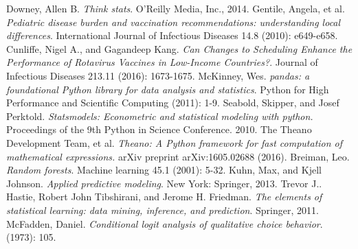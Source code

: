 \documentclass[prl,onecolumn,amsmath,amssymb,superscriptaddress,notitlepage]{revtex4-1}
\begin{document}
\begin{thebibliography}{1}
 Downey, Allen B. \emph{Think stats}. O'Reilly Media, Inc., 2014.
Gentile, Angela, et al. \emph{Pediatric disease burden and vaccination recommendations: understanding local differences}. International Journal of Infectious Diseases 14.8 (2010): e649-e658.
Cunliffe, Nigel A., and Gagandeep Kang. \emph{Can Changes to Scheduling Enhance the Performance of Rotavirus Vaccines in Low-Income Countries?}. Journal of Infectious Diseases 213.11 (2016): 1673-1675.
McKinney, Wes. \emph{pandas: a foundational Python library for data analysis and statistics}. Python for High Performance and Scientific Computing (2011): 1-9.
Seabold, Skipper, and Josef Perktold. \emph{Statsmodels: Econometric and statistical modeling with python.} Proceedings of the 9th Python in Science Conference. 2010.
 The Theano Development Team, et al. \emph{Theano: A Python framework for fast computation of mathematical expressions.} arXiv preprint arXiv:1605.02688 (2016).
 Breiman, Leo. \emph{Random forests}. Machine learning 45.1 (2001): 5-32.
 Kuhn, Max, and Kjell Johnson. \emph{Applied predictive modeling}. New York: Springer, 2013.
Trevor J.. Hastie, Robert John Tibshirani, and Jerome H. Friedman. \emph{The elements of statistical learning: data mining, inference, and prediction}. Springer, 2011.
 McFadden, Daniel. \emph{Conditional logit analysis of qualitative choice behavior}. (1973): 105.






\end{thebibliography}
\end{document}
